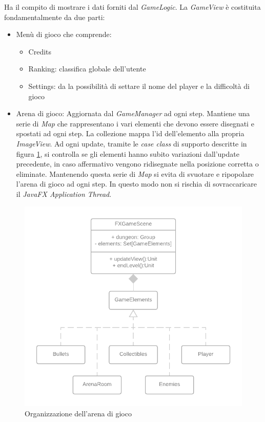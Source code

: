 Ha il compito di mostrare i dati forniti dal \textit{GameLogic}. 
La \textit{GameView} è costituita fondamentalmente da due parti:

\begin{itemize}
    \item Menù di gioco che comprende:
    \begin{itemize}
        \item Credits
        \item Ranking: classifica globale dell'utente
        \item Settings: da la possibilità di settare il nome del player e la difficoltà di gioco
    \end{itemize}
    \item Arena di gioco: Aggiornata dal \textit{GameManager} ad ogni step. Mantiene una serie di \textit{Map} che rappresentano i vari elementi che devono essere disegnati e spostati ad ogni step. La collezione mappa l'id dell'elemento alla propria \textit{ImageView}. Ad ogni update, tramite le \textit{case class} di supporto descritte in figura \ref{view}, si controlla se gli elementi hanno subito variazioni dall'update precedente, in caso affermativo vengono ridisegnate nella posizione corretta o eliminate.
    Mantenendo questa serie di \textit{Map} si evita di svuotare e ripopolare l'arena di gioco ad ogni step. In questo modo non si rischia di sovraccaricare il \textit{JavaFX Application Thread}.
\end{itemize}

\begin{figure}[H]
  \includegraphics[width=15cm]{report/res/VIEW_Diagram.png}
  \caption{Organizzazione dell'arena di gioco}
  \label{view}
\end{figure}